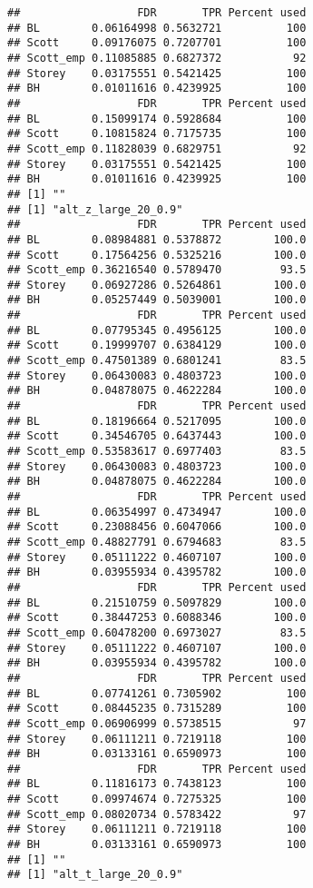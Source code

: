 \documentclass{article}\usepackage[]{graphicx}\usepackage[]{color}
\makeatletter
\newenvironment{kframe}{%
 \def\at@end@of@kframe{}%
 \ifinner\ifhmode%
  \def\at@end@of@kframe{\end{minipage}}%
  \begin{minipage}{\columnwidth}%
 \fi\fi%
 \def\FrameCommand##1{\hskip\@totalleftmargin \hskip-\fboxsep
 \colorbox{shadecolor}{##1}\hskip-\fboxsep
     \hskip-\linewidth \hskip-\@totalleftmargin \hskip\columnwidth}%
 \MakeFramed {\advance\hsize-\width
   \@totalleftmargin\z@ \linewidth\hsize
   \@setminipage}}%
 {\par\unskip\endMakeFramed%
 \at@end@of@kframe}
\newenvironment{knitrout}{}{} %
\makeatother
\begin{document}
\begin{knitrout}
\begin{kframe}
\begin{verbatim}
##                  FDR       TPR Percent used
## BL        0.06164998 0.5632721          100
## Scott     0.09176075 0.7207701          100
## Scott_emp 0.11085885 0.6827372           92
## Storey    0.03175551 0.5421425          100
## BH        0.01011616 0.4239925          100
##                  FDR       TPR Percent used
## BL        0.15099174 0.5928684          100
## Scott     0.10815824 0.7175735          100
## Scott_emp 0.11828039 0.6829751           92
## Storey    0.03175551 0.5421425          100
## BH        0.01011616 0.4239925          100
## [1] ""
## [1] "alt_z_large_20_0.9"
##                  FDR       TPR Percent used
## BL        0.08984881 0.5378872        100.0
## Scott     0.17564256 0.5325216        100.0
## Scott_emp 0.36216540 0.5789470         93.5
## Storey    0.06927286 0.5264861        100.0
## BH        0.05257449 0.5039001        100.0
##                  FDR       TPR Percent used
## BL        0.07795345 0.4956125        100.0
## Scott     0.19999707 0.6384129        100.0
## Scott_emp 0.47501389 0.6801241         83.5
## Storey    0.06430083 0.4803723        100.0
## BH        0.04878075 0.4622284        100.0
##                  FDR       TPR Percent used
## BL        0.18196664 0.5217095        100.0
## Scott     0.34546705 0.6437443        100.0
## Scott_emp 0.53583617 0.6977403         83.5
## Storey    0.06430083 0.4803723        100.0
## BH        0.04878075 0.4622284        100.0
##                  FDR       TPR Percent used
## BL        0.06354997 0.4734947        100.0
## Scott     0.23088456 0.6047066        100.0
## Scott_emp 0.48827791 0.6794683         83.5
## Storey    0.05111222 0.4607107        100.0
## BH        0.03955934 0.4395782        100.0
##                  FDR       TPR Percent used
## BL        0.21510759 0.5097829        100.0
## Scott     0.38447253 0.6088346        100.0
## Scott_emp 0.60478200 0.6973027         83.5
## Storey    0.05111222 0.4607107        100.0
## BH        0.03955934 0.4395782        100.0
##                  FDR       TPR Percent used
## BL        0.07741261 0.7305902          100
## Scott     0.08445235 0.7315289          100
## Scott_emp 0.06906999 0.5738515           97
## Storey    0.06111211 0.7219118          100
## BH        0.03133161 0.6590973          100
##                  FDR       TPR Percent used
## BL        0.11816173 0.7438123          100
## Scott     0.09974674 0.7275325          100
## Scott_emp 0.08020734 0.5783422           97
## Storey    0.06111211 0.7219118          100
## BH        0.03133161 0.6590973          100
## [1] ""
## [1] "alt_t_large_20_0.9"

\end{verbatim}
\end{kframe}
\end{knitrout}
\end{document}
